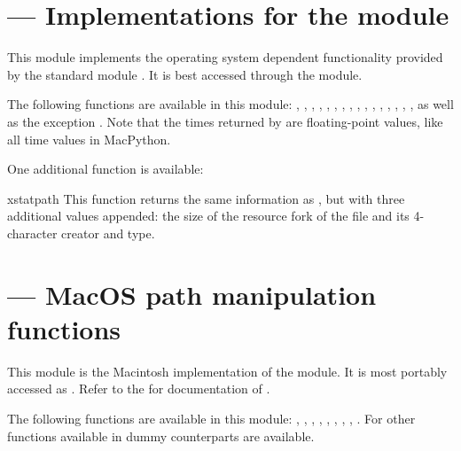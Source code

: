 \section{ ---
         Implementations for the  module}



This module implements the operating system dependent functionality
provided by the standard module .  It is
best accessed through the  module.

The following functions are available in this module:
,
,
,
,
,
,
,
,
,
,
,
,
,
,
,
,
as well as the exception . Note that the times
returned by  are floating-point values, like all time
values in MacPython.

One additional function is available:

\begin{funcdesc}{xstat}{path}
  This function returns the same information as , but
  with three additional values appended: the size of the resource fork
  of the file and its 4-character creator and type.
\end{funcdesc}


\section{ ---
         MacOS path manipulation functions}



This module is the Macintosh implementation of the 
module.  It is most portably accessed as
.  Refer to the
 for
documentation of .

The following functions are available in this module:
,
,
,
,
,
,
,
,
.
For other functions available in  dummy counterparts
are available.
